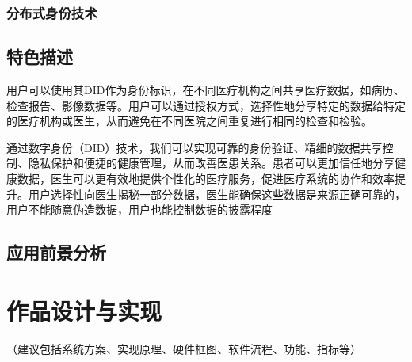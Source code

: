 \documentclass{cumcmthesis}
\numberwithin{equation}{section} %
\numberwithin{figure}{section} %
\numberwithin{table}{section} %
\begin{document}
\subsubsection{分布式身份技术}

\subsection{特色描述}

用户可以使用其DID作为身份标识，在不同医疗机构之间共享医疗数据，如病历、检查报告、影像数据等。用户可以通过授权方式，选择性地分享特定的数据给特定的医疗机构或医生，从而避免在不同医院之间重复进行相同的检查和检验。

通过数字身份（DID）技术，我们可以实现可靠的身份验证、精细的数据共享控制、隐私保护和便捷的健康管理，从而改善医患关系。患者可以更加信任地分享健康数据，医生可以更有效地提供个性化的医疗服务，促进医疗系统的协作和效率提升。用户选择性向医生揭秘一部分数据，医生能确保这些数据是来源正确可靠的，用户不能随意伪造数据，用户也能控制数据的披露程度

\subsection{应用前景分析}

\newpage

\section{作品设计与实现}

（建议包括系统方案、实现原理、硬件框图、软件流程、功能、指标等）
\end{document}
